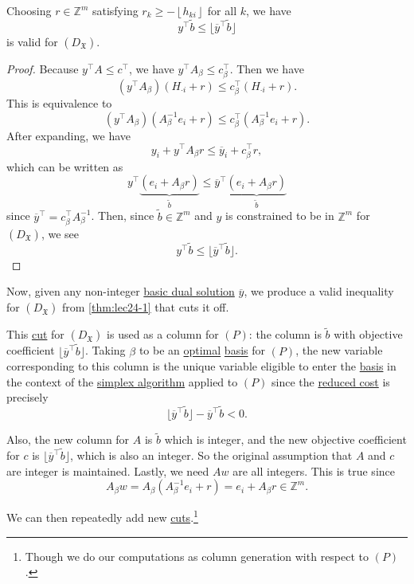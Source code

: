 \begin{theorem}\label{thm:lec24-2}
	Choosing \(r\in\mathbb{Z} ^m\) satisfying \(r_k \geq - \left\lfloor h_{ki} \right\rfloor\) for all \(k\), we have
	\[
		y^{\top} \widetilde{b} \leq \lfloor \overline{y} ^{\top} \widetilde{b} \rfloor
	\]
	is valid for \((D_{\mathfrak{X}})\).
\end{theorem}
\begin{proof}
	Because \(y^{\top}A\leq c^{\top}\), we have \(y^{\top}A_{\beta}\leq c_{\beta}^{\top}\). Then we have
	\[
		\left(y^{\top}A_{\beta}\right)\left(H_{\cdot i}+r\right) \leq c_{\beta}^{\top}\left(H_{\cdot i}+r\right).
	\]
	This is equivalence to
	\[
		\left(y^{\top}A_{\beta}\right)\left(A^{-1}_{\beta}e_{i}+r\right) \leq c_{\beta}^{\top}\left(A^{-1}_{\beta}e_{i}+r\right).
	\]
	After expanding, we have
	\[
		y_{i}+y^{\top}A_{\beta}r\leq \overline{y}_{i}+c_{\beta}^{\top}r,
	\]
	which can be written as
	\[
		y^{\top}\underbrace{\left(e_{i}+A_{\beta}r\right)}_{\widetilde{b} } \leq \overline{y}^{\top} \underbrace{\left(e_{i}+A_{\beta}r\right)}_{\widetilde{b}}
	\]
	since \(\overline{y}^{\top} = c_{\beta}^{\top}A^{-1}_{\beta}\). Then, since \(\widetilde{b} \in \mathbb{Z} ^m\) and \(y\) is constrained to be
	in \(\mathbb{Z} ^m\) for \((D_{\mathfrak{X}})\), we see
	\[
		y^{\top}\widetilde{b}\leq \lfloor \overline{y}^{\top}\widetilde{b} \rfloor.
	\]
\end{proof}

Now, given any non-integer \hyperref[def:dual-basic-solution]{basic dual solution} \(\overline{y}\), we produce a valid inequality for \((D_{\mathfrak{X}})\)
from \autoref{thm:lec24-1} that cuts it off.
\begin{note}
	This \hyperref[def:Chvatal-Gomory-cut]{cut} for \((D_{\mathfrak{X}})\) is used as a column for \((P)\): the column is \(\widetilde{b} \) with objective coefficient \(\lfloor \overline{y} ^{\top} \widetilde{b} \rfloor\).
	Taking \(\beta\) to be an \hyperref[def:optimal-solution]{optimal} \hyperref[def:basic]{basis} for \((P)\), the new variable corresponding to this column is the unique
	variable eligible to enter the \hyperref[def:basic]{basis} in the context of the \hyperref[algo:simplex-algorithm]{simplex algorithm} applied to \((P)\) since the
	\hyperref[def:reduced-cost]{reduced cost} is precisely
	\[
		\lfloor \overline{y} ^{\top} \widetilde{b} \rfloor-\overline{y} ^{\top} \widetilde{b} < 0.
	\]

	Also, the new column for \(A\) is \(\widetilde{b} \) which is integer, and the new objective coefficient for \(c\) is
	\(\lfloor \overline{y} ^{\top} \widetilde{b} \rfloor\), which is also an integer. So the original assumption that \(A\)
	and \(c\) are integer is maintained. Lastly, we need \(Aw\) are all integers. This is true since
	\[
		A_{\beta}w = A_{\beta}\left(A^{-1}_{\beta}e_{i}+r\right) = e_{i}+A_{\beta}r \in \mathbb{Z}^m.
	\]

	We can then repeatedly add new \hyperref[def:Chvatal-Gomory-cut]{cuts}.\footnote{Though we do our computations as column generation with respect to \((P)\).}
\end{note}

